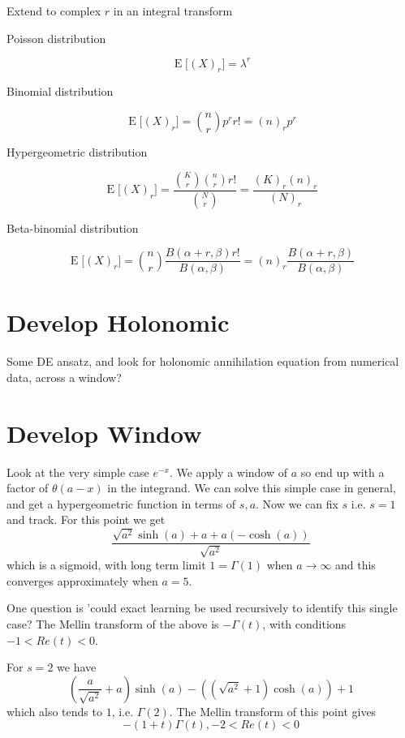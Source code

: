 \documentclass{article}
\begin{document}
Extend to complex $r$ in an integral transform

Poisson distribution

$$\operatorname{E}\bigl[(X)_r\bigr] =\lambda^r$$


Binomial distribution

$$\operatorname{E}\bigl[(X)_r\bigr] = \binom{n}{r} p^r r! = (n)_r p^r$$

Hypergeometric distribution

$$\operatorname{E}\bigl[(X)_r\bigr] = \frac{\binom{K}{r}\binom{n}{r}r!}{\binom{N}{r}} = \frac{(K)_r (n)_r}{(N)_r}$$

Beta-binomial distribution

$$\operatorname{E}\bigl[(X)_r\bigr] = \binom{n}{r}\frac{B(\alpha+r,\beta)r!}{B(\alpha,\beta)} =
(n)_r \frac{B(\alpha+r,\beta)}{B(\alpha,\beta)}$$


\section{Develop Holonomic}
Some DE ansatz, and look for holonomic annihilation equation from numerical data, across a window?



\section{Develop Window}
Look at the  very simple case $e^{-x}$. We apply a window of $a$ so end up with a factor of $\theta(a-x)$ in the integrand. We can solve this simple case in general, and get a hypergeometric function in terms of $s,a$. Now we can fix $s$ i.e. $s=1$ and track. For this point we get 
$$
\frac{\sqrt{a^2} \sinh (a)+a+a (-\cosh (a))}{\sqrt{a^2}}
$$
which is a sigmoid, with long term limit $1=\Gamma(1)$ when $a \to \infty$ and this converges approximately when $a=5$. 

One question is 'could exact learning be used recursively to identify this single case? The Mellin transform of the above is $-\Gamma(t)$, with conditions $-1 < Re(t) < 0$.

For $s=2$ we have 
$$
\left(\frac{a}{\sqrt{a^2}}+a\right) \sinh (a)-\left(\left(\sqrt{a^2}+1\right) \cosh
    (a)\right)+1
$$
which also tends to $1$, i.e. $\Gamma(2)$. The Mellin transform of this point gives 
$$
    -(1+t)\Gamma(t), -2 < Re(t) < 0
$$
\end{document}
